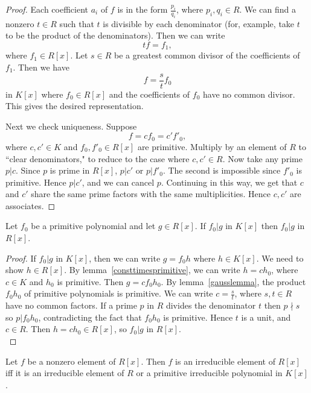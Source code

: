 \begin{proof}
Each coefficient $a_i$ of $f$ is in the form $\frac{p_i}{q_i}$, where $p_i,q_i\in R$. We can find a nonzero $t\in R$ such that $t$ is divisible by each denominator (for, example, take $t$ to be the product of the denominators). Then we can write
\[tf=f_1,\]
where $f_1\in R[x]$. Let $s\in R$ be a greatest common divisor of the coefficients of $f_1$. Then we have
\[f=\frac{s}{t}f_0\]
in $K[x]$ where $f_0\in R[x]$ and the coefficients of $f_0$ have no common divisor. This gives the desired representation.

Next we check uniqueness. Suppose
\[f=cf_0=c'f'_0,\]
where $c,c'\in K$ and $f_0,f'_0\in R[x]$ are primitive. Multiply by an element of $R$ to ``clear denominators," to reduce to the case where $c,c'\in R$. Now take any prime $p|c$. Since $p$ is prime in $R[x]$, $p|c'$ or $p|f'_0$. The second is impossible since $f'_0$ is primitive. Hence $p|c'$, and we can cancel $p$. Continuing in this way, we get that $c$ and $c'$ share the same prime factors with the same multiplicities. Hence $c,c'$ are associates.
\end{proof}
\begin{lem}\label{divprim}
Let $f_0$ be a primitive polynomial and let $g\in R[x]$. If $f_0|g$ in $K[x]$ then $f_0|g$ in $R[x]$.\\
\end{lem}
\begin{proof}
If $f_0|g$ in $K[x]$, then we can write $g=f_0h$ where $h\in K[x]$. 
We need to show $h\in R[x]$. By lemma~\ref{consttimesprimitive}, we can write $h=ch_0$, where $c\in K$ and $h_0$ is primitive.  
Then $g=cf_0h_0$. By lemma~\ref{gausslemma}, the product $f_0h_0$ of primitive polynomials is primitive. 
We can write $c=\frac{s}{t}$, where $s,t\in R$ have no common factors. 
If a prime $p$ in $R$ divides the denominator $t$ then 
$p\nmid  s$ so $p|f_0h_0$, contradicting the fact that $f_0h_0$ is primitive. 
Hence $t$ is a unit, and $c\in R$. Then $h=ch_0\in R[x]$, so $f_0|g$ in $R[x]$.\\
\end{proof}
\begin{lem}\label{irreds}
Let $f$ be a nonzero element of $R[x]$. Then $f$ is an irreducible element of $R[x]$ iff it is an irreducible element of $R$ or a primitive irreducible polynomial in $K[x]$.
\end{lem}
